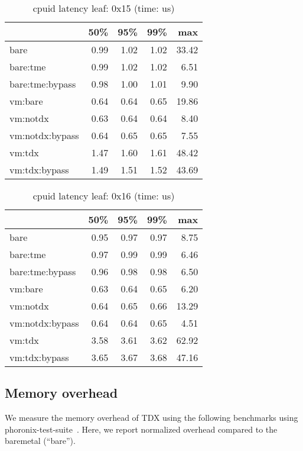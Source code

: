 \documentclass[letterpaper,twocolumn,10pt]{article}
\begin{document}
\begin{table}
\centering
\caption{cpuid latency leaf: 0x15 (time: us)}
\label{tab:cpuid_0x15}
\begin{tabular}{lrrrr}
\toprule
{} &  50\% &  95\% &  99\% &   max \\
\midrule
bare            & 0.99 & 1.02 & 1.02 & 33.42 \\
bare:tme        & 0.99 & 1.02 & 1.02 &  6.51 \\
bare:tme:bypass & 0.98 & 1.00 & 1.01 &  9.90 \\
vm:bare         & 0.64 & 0.64 & 0.65 & 19.86 \\
vm:notdx        & 0.63 & 0.64 & 0.64 &  8.40 \\
vm:notdx:bypass & 0.64 & 0.65 & 0.65 &  7.55 \\
vm:tdx          & 1.47 & 1.60 & 1.61 & 48.42 \\
vm:tdx:bypass   & 1.49 & 1.51 & 1.52 & 43.69 \\
\bottomrule
\end{tabular}
\end{table}

\begin{table}
\centering
\caption{cpuid latency leaf: 0x16 (time: us)}
\label{tab:cpuid_0x16}
\begin{tabular}{lrrrr}
\toprule
{} &  50\% &  95\% &  99\% &   max \\
\midrule
bare            & 0.95 & 0.97 & 0.97 &  8.75 \\
bare:tme        & 0.97 & 0.99 & 0.99 &  6.46 \\
bare:tme:bypass & 0.96 & 0.98 & 0.98 &  6.50 \\
vm:bare         & 0.63 & 0.64 & 0.65 &  6.20 \\
vm:notdx        & 0.64 & 0.65 & 0.66 & 13.29 \\
vm:notdx:bypass & 0.64 & 0.64 & 0.65 &  4.51 \\
vm:tdx          & 3.58 & 3.61 & 3.62 & 62.92 \\
vm:tdx:bypass   & 3.65 & 3.67 & 3.68 & 47.16 \\
\bottomrule
\end{tabular}
\end{table}

\subsection{Memory overhead}
We measure the memory overhead of TDX using the following benchmarks using phoronix-test-suite~\cite{phoronix}.
Here, we report normalized overhead compared to the baremetal (``bare'').
\end{document}

